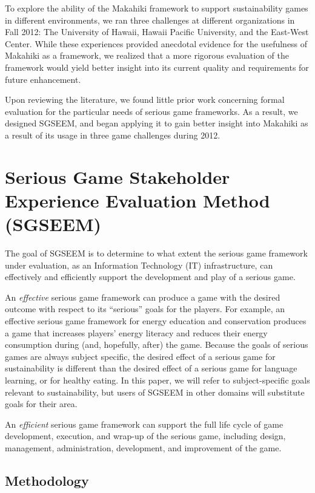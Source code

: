 \documentclass{sigchi}
\begin{document}

To explore the ability of the Makahiki framework to support
sustainability games in different environments, we ran three
challenges at different organizations in Fall 2012: The University of
Hawaii, Hawaii Pacific University, and the East-West Center. While
these experiences provided anecdotal evidence for the usefulness of
Makahiki as a framework, we realized that a more rigorous evaluation of the framework
would yield better insight into its current quality and requirements
for future enhancement.

Upon reviewing the literature, we found little prior work concerning formal evaluation for
the particular needs of serious game frameworks. As a result, we designed SGSEEM, and
began applying it to gain better insight into Makahiki as a result of its usage in three
game challenges during 2012.

\section{Serious Game Stakeholder Experience Evaluation Method (SGSEEM)}

The goal of SGSEEM is to determine to what extent the serious game
framework under evaluation, as an Information Technology (IT)
infrastructure, can effectively and efficiently support the
development and play of a serious game.

An \emph{effective} serious game framework can produce a game with the desired outcome
with respect to its ``serious'' goals for the players. For example, an effective serious
game framework for energy education and conservation produces a game that increases
players' energy literacy and reduces their energy consumption during (and, hopefully,
after) the game. Because the goals of serious games are always subject specific, the
desired effect of a serious game for sustainability is different than the desired effect
of a serious game for language learning, or for healthy eating.  In this paper, we will 
refer to subject-specific goals relevant to sustainability, but users of SGSEEM in other
domains will substitute goals for their area. 

An \emph{efficient} serious game framework can support the
full life cycle of game development, execution, and wrap-up of the
serious game, including design, management, administration, development,
and improvement of the game.

\subsection{Methodology}
\end{document}
